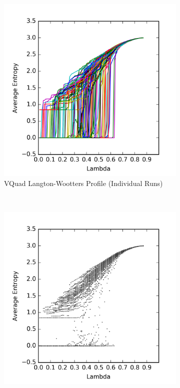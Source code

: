 \documentclass[a4paper,11pt]{report}
\begin{document}
\begin{figure}[htp]
\centering
\begin{subfigure}[t]{0.6\textwidth}
  \includegraphics[width=\textwidth]{ch6_figs/vor_entropy}
  \caption{VQuad Langton-Wootters Profile (Individual Runs)}
  \label{fig:vor_lw_run}
\end{subfigure}
~
\begin{subfigure}[t]{0.6\textwidth}
  \centering
  \includegraphics[width=\textwidth]{ch6_figs/vor_entropy_scatter}

\end{subfigure}
\end{figure}
\end{document}
